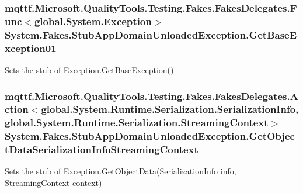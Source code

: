 \hypertarget{class_system_1_1_fakes_1_1_stub_app_domain_unloaded_exception_a8dc67a3b3a080e2064c2c06151f6fc41}{
\subsubsection[{Get\-Base\-Exception01}]{\setlength{\rightskip}{0pt plus 5cm}mqttf.\-Microsoft.\-Quality\-Tools.\-Testing.\-Fakes.\-Fakes\-Delegates.\-Func$<$global.\-System.\-Exception$>$ System.\-Fakes.\-Stub\-App\-Domain\-Unloaded\-Exception.\-Get\-Base\-Exception01}}\label{class_system_1_1_fakes_1_1_stub_app_domain_unloaded_exception_a8dc67a3b3a080e2064c2c06151f6fc41}


Sets the stub of Exception.\-Get\-Base\-Exception()

\hypertarget{class_system_1_1_fakes_1_1_stub_app_domain_unloaded_exception_ae04315b090e5ecc9158a732c8dcbbaa8}{
\subsubsection[{Get\-Object\-Data\-Serialization\-Info\-Streaming\-Context}]{\setlength{\rightskip}{0pt plus 5cm}mqttf.\-Microsoft.\-Quality\-Tools.\-Testing.\-Fakes.\-Fakes\-Delegates.\-Action$<$global.\-System.\-Runtime.\-Serialization.\-Serialization\-Info, global.\-System.\-Runtime.\-Serialization.\-Streaming\-Context$>$ System.\-Fakes.\-Stub\-App\-Domain\-Unloaded\-Exception.\-Get\-Object\-Data\-Serialization\-Info\-Streaming\-Context}}\label{class_system_1_1_fakes_1_1_stub_app_domain_unloaded_exception_ae04315b090e5ecc9158a732c8dcbbaa8}


Sets the stub of Exception.\-Get\-Object\-Data(\-Serialization\-Info info, Streaming\-Context context)

